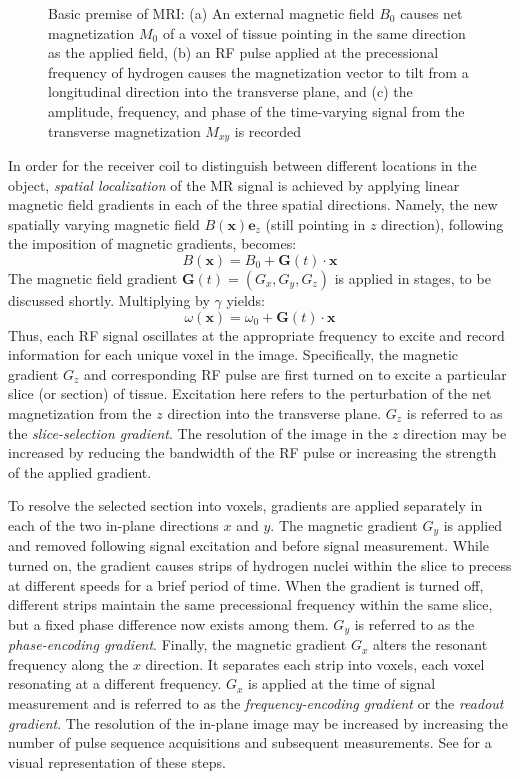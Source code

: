 \begin{figure}[ht]
{\label{fig:mr23}}
%
\caption{Basic premise of MRI: (a) An external magnetic field $B_0$ causes net magnetization $M_0$ of a voxel of tissue pointing in the same direction as the applied field, (b) an RF pulse applied at the precessional frequency of hydrogen causes the magnetization vector to tilt from a longitudinal direction into the transverse plane, and (c) the amplitude, frequency, and phase of the time-varying signal from the transverse magnetization $M_{xy}$ is recorded~\cite{hendrick_1994}}
\label{fig:mr2}
\end{figure}

In order for the receiver coil to distinguish between different locations in the object, \textit{spatial localization} of the MR signal is achieved by applying linear magnetic field gradients in each of the three spatial directions. Namely, the new spatially varying magnetic field $B(\bm{x})\bm{e}_z$ (still pointing in $z$ direction), following the imposition of magnetic gradients, becomes:
\begin{equation}
B(\bm{x}) = B_0 + \bm{G}(t) \cdot \bm{x}
\label{eqn:gradient}
\end{equation}
The magnetic field gradient $\bm{G}(t) = (G_x, G_y, G_z)$ is applied in stages, to be discussed shortly. Multiplying  by $\gamma$ yields:
\begin{equation}
\omega(\bm{x}) = \omega_0 + \bm{G}(t) \cdot \bm{x}
\label{eqn:freq}
\end{equation}
Thus, each RF signal oscillates at the appropriate frequency to excite and record information for each unique voxel in the image. Specifically, the magnetic gradient $G_z$ and corresponding RF pulse are first turned on to excite a particular slice (or section) of tissue. Excitation here refers to the perturbation of the net magnetization from the $z$ direction into the transverse plane. $G_z$ is referred to as the \textit{slice-selection gradient}. The resolution of the image in the $z$ direction may be increased by reducing the bandwidth of the RF pulse or increasing the strength of the applied gradient.

To resolve the selected section into voxels, gradients are applied separately in each of the two in-plane directions $x$ and $y$. The magnetic gradient $G_y$ is applied and removed following signal excitation and before signal measurement. While turned on, the gradient causes strips of hydrogen nuclei within the slice to precess at different speeds for a brief period of time. When the gradient is turned off, different strips maintain the same precessional frequency within the same slice, but a fixed phase difference now exists among them. $G_y$ is referred to as the \textit{phase-encoding gradient}. Finally, the magnetic gradient $G_x$ alters the resonant frequency along the $x$ direction. It separates each strip into voxels, each voxel resonating at a different frequency. $G_x$ is applied at the time of signal measurement and is referred to as the  \textit{frequency-encoding gradient} or the \textit{readout gradient}. The resolution of the in-plane image may be increased by increasing the number of pulse sequence acquisitions and subsequent measurements. See  for a visual representation of these steps.

